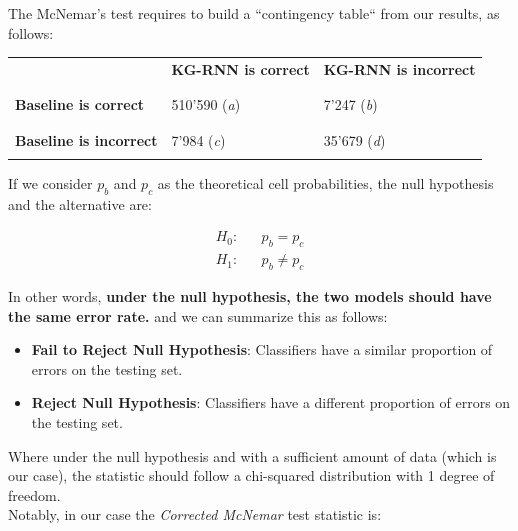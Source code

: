 The McNemar's test requires to build a ``contingency table`` from our results, as follows: \\

\begin{table}[H]
 \begin{center}
  \begin{tabular}{ p{4cm} | p{4cm} | p{4cm} }
   & \textbf{KG-RNN is correct}  & \textbf{KG-RNN is incorrect} \\
   && \\ \hline
   && \\
   \textbf{Baseline is correct} & 510'590 (\textit{a}) & 7'247 (\textit{b}) \\
   && \\ \hline
   && \\
   \textbf{Baseline is incorrect} & 7'984 (\textit{c}) & 35'679 (\textit{d}) \\
   && \\ \hline
  \end{tabular}
 \end{center}
\end{table}

If we consider $p_b$ and $p_c$ as the theoretical cell probabilities, the null hypothesis and the alternative are:

\begin{equation*}
 \begin{aligned}
  H_0: &&p_b = p_c \\
  H_1: &&p_b \neq p_c
 \end{aligned}
\end{equation*}

In other words, \textbf{under the null hypothesis, the two models should have the same error rate.} and we can summarize this as follows:

\begin{itemize}
 \item \textbf{Fail to Reject Null Hypothesis}: Classifiers have a similar proportion of errors on the testing set.
 \item \textbf{Reject Null Hypothesis}: Classifiers have a different proportion of errors on the testing set.
\end{itemize}

Where under the null hypothesis and with a sufficient amount of data (which is our case), the statistic should follow a chi-squared distribution with 1 degree of freedom. \\

Notably, in our case the \emph{Corrected McNemar} test statistic is: \\

